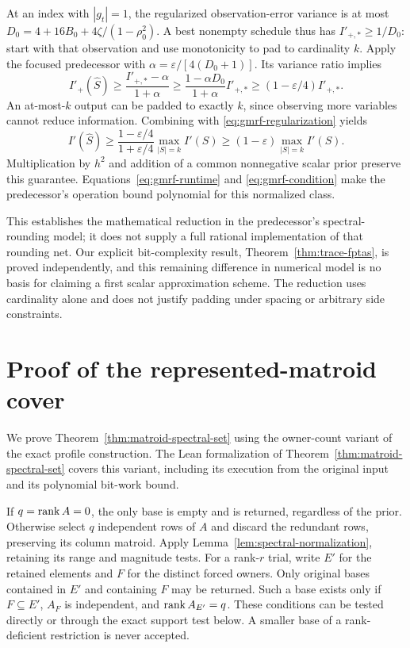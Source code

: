 At an index with $|g_t|=1$, the regularized observation-error variance is
at most $D_0=4+16B_0+4\zeta/(1-\rho_0^2)$. A best nonempty schedule thus
has $I'_{+,*}\ge1/D_0$: start with that observation and use monotonicity to
pad to cardinality $k$. Apply the focused predecessor with
$\alpha=\varepsilon/[4(D_0+1)]$. Its variance ratio implies
\[
 I'_+(\widehat S)\ge\frac{I'_{+,*}-\alpha}{1+\alpha}
 \ge\frac{1-\alpha D_0}{1+\alpha}I'_{+,*}
 \ge(1-\varepsilon/4)I'_{+,*}.
\]
An at-most-$k$ output can be padded to exactly $k$, since observing more
variables cannot reduce information. Combining with
\eqref{eq:gmrf-regularization} yields
\[
 I'(\widehat S)\ge
 \frac{1-\varepsilon/4}{1+\varepsilon/4}\max_{|S|=k}I'(S)
 \ge(1-\varepsilon)\max_{|S|=k}I'(S).
\]
Multiplication by $h^2$ and addition of a common nonnegative scalar prior
preserve this guarantee. Equations~\eqref{eq:gmrf-runtime} and
\eqref{eq:gmrf-condition} make the predecessor's operation bound polynomial
for this normalized class.

This establishes the mathematical reduction in the predecessor's
spectral-rounding model; it does not supply a full rational implementation of
that rounding net. Our explicit bit-complexity result,
Theorem~\ref{thm:trace-fptas}, is proved independently, and this remaining
difference in numerical model is no basis for claiming a first scalar
approximation scheme. The reduction uses cardinality alone and does not
justify padding under spacing or arbitrary side constraints.

\section{Proof of the represented-matroid cover}
\label{app:matroid-proof}
We prove Theorem~\ref{thm:matroid-spectral-set} using the owner-count
variant of the exact profile construction. The Lean formalization of
Theorem~\ref{thm:matroid-spectral-set} covers this variant, including its
execution from the original input and its polynomial bit-work bound.

If $q=\operatorname{rank} A=0$, the only base is empty and is returned, regardless of
the prior. Otherwise select $q$ independent rows of $A$ and discard the
redundant rows, preserving its column matroid. Apply
Lemma~\ref{lem:spectral-normalization}, retaining its range and magnitude
tests. For a rank-$r$ trial, write $E'$ for the retained elements and $F$
for the distinct forced owners. Only original bases contained in $E'$
and containing $F$ may be returned. Such a base exists only if
$F\subseteq E'$, $A_F$ is independent, and $\operatorname{rank} A_{E'}=q$.
These conditions can be tested directly or through the exact support test
below. A smaller base of a rank-deficient restriction is never accepted.

